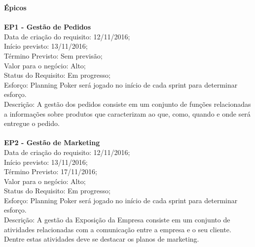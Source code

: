 \begin{apendicesenv}
\textbf{Épicos} \\
\\
\textbf{EP1 - Gestão de Pedidos} \\
\tab Data de criação do requisito: 12/11/2016;\\
\tab Início previsto: 13/11/2016;\\
\tab Término Previsto: Sem previsão;\\
\tab Valor para o negócio: Alto;\\
\tab Status do Requisito: Em progresso;\\
\tab Esforço: Planning Poker será jogado no início de cada sprint para determinar esforço.\\
\tab Descrição: A gestão dos pedidos consiste em um conjunto de funções relacionadas a informações sobre produtos que caracterizam ao que, como, quando e onde será entregue o pedido.\\
\\
\textbf{EP2 - Gestão de Marketing} \\
\tab Data de criação do requisito: 12/11/2016;\\
\tab Início previsto: 13/11/2016;\\
\tab Término Previsto: 17/11/2016;\\
\tab Valor para o negócio: Alto;\\
\tab Status do Requisito: Em progresso;\\
\tab Esforço: Planning Poker será jogado no início de cada sprint para determinar esforço.\\
\tab Descrição:  A gestão da Exposição da Empresa consiste em um conjunto de atividades relacionadas com a comunicação entre a empresa e o seu cliente. Dentre estas atividades deve se destacar os planos de marketing.\\
\\


\end{apendicesenv}
